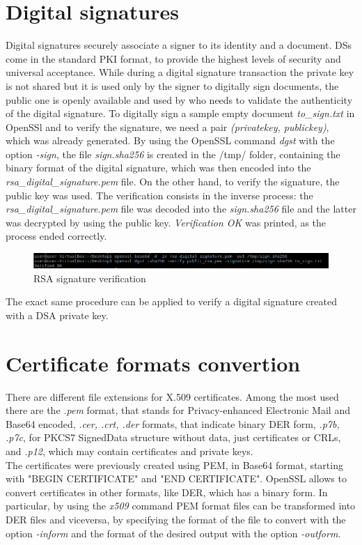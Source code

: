 \documentclass[11pt]{article}
\begin{document}
\section{Digital signatures}
Digital signatures securely associate a signer to its identity and a document. DSs come in the standard PKI format, to provide the highest levels of security and universal acceptance. While during a digital signature transaction the private key is not shared but it is used only by the signer to digitally sign documents, the public one is openly available and used by who needs to validate the authenticity of the digital signature. 
To digitally sign a sample empty document \textit{to\_sign.txt} in OpenSSl and to verify the signature, we need a pair \textit{(privatekey, publickey)}, which was already generated. 
By using the OpenSSL command \textit{dgst} with the option \textit{-sign}, the file \textit{sign.sha256} is created in the /tmp/ folder, containing the binary format of the digital signature, which was then encoded into the \textit{rsa\_digital\_signature.pem} file. On the other hand, to verify the signature, the public key was used. The verification consists in the inverse process: the \textit{rsa\_digital\_signature.pem} file was decoded into the \textit{sign.sha256} file and the latter was decrypted by using the public key. \textit{Verification OK} was printed, as the process ended correctly.

\begin{figure}[H]
	\includegraphics[width=1\textwidth]{img7-hw6-1743261.png}
	\caption{RSA signature verification}
\end{figure}
The exact same procedure can be applied to verify a digital signature created with a DSA private key.\\

\section{Certificate formats convertion}
There are different file extensions for X.509 certificates. Among the most used there are the \textit{.pem} format, that stands for Privacy-enhanced Electronic Mail and Base64 encoded, \textit{.cer, .crt, .der} formats, that indicate binary DER form, \textit{.p7b, .p7c}, for PKCS7 SignedData structure without data, just certificates or CRLs, and \textit{.p12}, which may contain certificates and private keys.\\
The certificates were previously created using PEM, in Base64 format, starting with "BEGIN CERTIFICATE" and "END CERTIFICATE". OpenSSL allows to convert certificates in other formats, like DER, which has a binary form. 
In particular, by using the \textit{x509} command PEM format files can be transformed into DER files and viceversa, by specifying the format of the file to convert with the option \textit{-inform} and the format of the desired output with the option \textit{-outform}.
\end{document}
